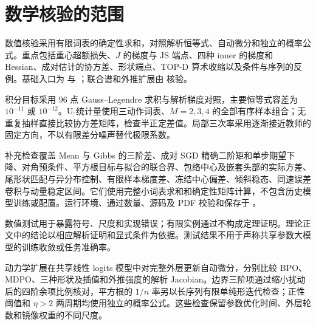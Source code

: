 \section*{数学核验的范围}
数值核验采用有限词表的确定性求和，对照解析恒等式、自动微分和独立的概率公式。重点包括重心超额损失、$J$ 的梯度与 JS 端点、四种 inner 的梯度和 Hessian、成对估计的协方差、形状端点、TOP-D 算术收缩以及条件与序列的反例。基础入口为  与 ；联合谱和外推扩展由  核验。

积分目标采用 96 点 Gauss--Legendre 求积与解析梯度对照，主要恒等式容差为 $10^{-11}$ 或 $10^{-12}$。U-统计量使用三动作词表、$M=2,3,4$ 的全部有序样本组合；无重复抽样直接比较协方差矩阵，检查半正定差值。局部三次率采用逐渐接近教师的固定方向，不以有限差分噪声替代极限系数。

补充检查覆盖 Mean 与 Gibbs 的三阶差、成对 SGD 精确二阶矩和单步期望下降、对角预条件、平方根目标与拟合的联合界、包络中心及嵌套头部的实际方差、尾形状匹配与异分布控制、有限样本梯度差、冻结中心偏差、倾斜稳态、同速误差卷积与动量稳定区间。它们使用完整小词表求和和确定性矩阵计算，不包含历史模型训练或配置。运行环境、通过数量、源码及 PDF 校验和保存于 。

数值测试用于暴露符号、尺度和实现错误；有限实例通过不构成定理证明。理论正文中的结论以相应解析证明和显式条件为依据。测试结果不用于声称共享参数大模型的训练收敛或任务准确率。

动力学扩展在共享线性 logits 模型中对完整外层更新自动微分，分别比较 BPO、MDPO、三种形状及插值和外推强度的解析 Jacobian。边界三阶项通过缩小扰动后的四阶余项比例核对，平方根的 $1/n$ 率另以长序列有限单纯形迭代检查；正性阈值和 $\eta>2$ 两周期均使用独立的概率公式。这些检查保留参数优化时间、外层轮数和镜像权重的不同尺度。
